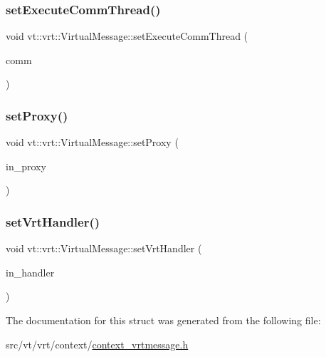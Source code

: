 \mbox{\label{structvt_1_1vrt_1_1_virtual_message_a8149137c049179f315d295b5127b61ad}} 
\subsubsection{\texorpdfstring{set\+Execute\+Comm\+Thread()}{setExecuteCommThread()}}
{\footnotesize\ttfamily void vt\+::vrt\+::\+Virtual\+Message\+::set\+Execute\+Comm\+Thread (\begin{DoxyParamCaption}\item[{bool const}]{comm }\end{DoxyParamCaption})\hspace{0.3cm}{\ttfamily [inline]}}

\mbox{\label{structvt_1_1vrt_1_1_virtual_message_aa4b2b70c7d560be3adff74102803ff51}} 
\subsubsection{\texorpdfstring{set\+Proxy()}{setProxy()}}
{\footnotesize\ttfamily void vt\+::vrt\+::\+Virtual\+Message\+::set\+Proxy (\begin{DoxyParamCaption}\item[{\hyperlink{namespacevt_a1b417dd5d684f045bb58a0ede70045ac}{Virtual\+Proxy\+Type} const \&}]{in\+\_\+proxy }\end{DoxyParamCaption})\hspace{0.3cm}{\ttfamily [inline]}}

\mbox{\label{structvt_1_1vrt_1_1_virtual_message_aea0a3a35d2517ef094c9467b0c4ff066}} 
\subsubsection{\texorpdfstring{set\+Vrt\+Handler()}{setVrtHandler()}}
{\footnotesize\ttfamily void vt\+::vrt\+::\+Virtual\+Message\+::set\+Vrt\+Handler (\begin{DoxyParamCaption}\item[{\hyperlink{namespacevt_af64846b57dfcaf104da3ef6967917573}{Handler\+Type} const \&}]{in\+\_\+handler }\end{DoxyParamCaption})\hspace{0.3cm}{\ttfamily [inline]}}



The documentation for this struct was generated from the following file\+:\begin{DoxyCompactItemize}
\item 
src/vt/vrt/context/\hyperlink{context__vrtmessage_8h}{context\+\_\+vrtmessage.\+h}\end{DoxyCompactItemize}
